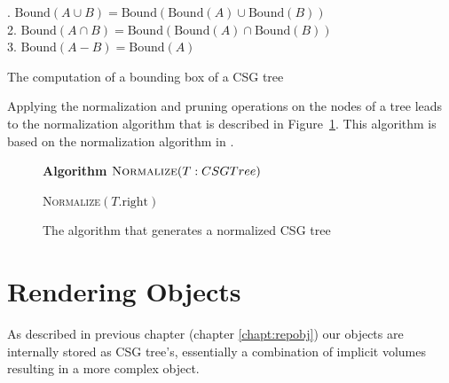 \documentclass[a4wide,10pt,twocolumn]{article}
\newcommand{\Bound}{\mbox{Bound}}
\begin{document}
    \begin{table}[h]
        {\fontsize{8.7}{10}. $\Bound(A \cup B) = \Bound(\Bound(A) \cup \Bound(B))$\\
            2. $\Bound(A \cap B) = \Bound(\Bound(A) \cap \Bound(B))$\\
            3. $\Bound(A - B)    = \Bound(A)$\\
        }
        \caption{The computation of a bounding box of a CSG tree}
        \label{table:bounding_box}
    \end{table}

    Applying the normalization and pruning operations on the nodes of a tree leads to the normalization algorithm that is described in  Figure~\ref{figure:algorithm}. This algorithm is based on the normalization algorithm in \cite{Wiegand96}.

    \begin{figure}[ht]
            \textbf{Algorithm} $\textsc{Normalize}(T: CSGTree)$\\
            \noindent
            \begin{algorithm}[H]
                \BlankLine
                \BlankLine
                \textsc{Normalize}$(T\mbox{.right})$\;
            \end{algorithm}
        \caption{The algorithm that generates a normalized CSG tree}
        \label{figure:algorithm}
    \end{figure}

\section{Rendering Objects}

As described in previous chapter (chapter \ref{chapt:repobj}) our objects are internally stored as CSG tree's, essentially a combination of implicit volumes resulting in a more complex object.
\end{document}
